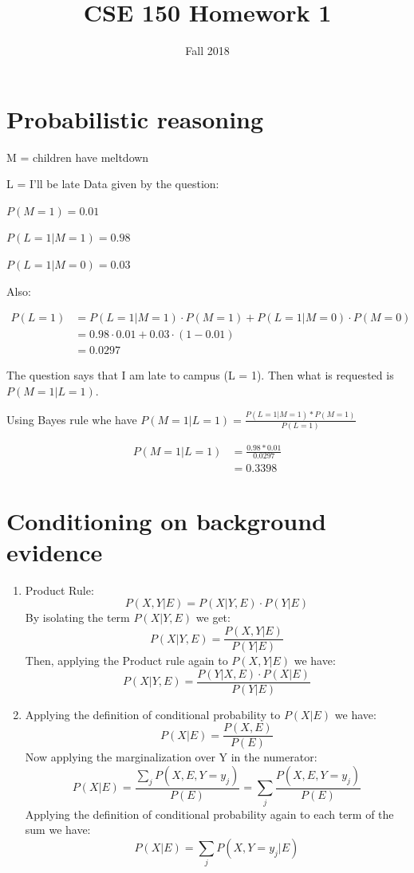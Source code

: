 \documentclass{article}
\title{CSE 150 Homework 1}
\date{Fall 2018}
\begin{document}
\maketitle
\section{Probabilistic reasoning}

\flushleft M = children have meltdown

L = I'll be late
\bigbreak
Data given by the question:

$P(M=1) = 0.01$

$P(L=1|M=1) = 0.98$

$P(L=1|M=0) = 0.03$
\bigbreak

Also:

\begin{align*}
P(L=1) &=P(L=1|M=1) \cdot P(M=1)+P(L=1|M=0) \cdot P(M=0)\\
&=0.98 \cdot 0.01 + 0.03 \cdot (1-0.01)\\
&=0.0297
\end{align*}
\bigbreak

The question says that I am late to campus (L = 1). Then what is requested is $P(M=1|L=1)$.

Using Bayes rule whe have $P(M=1|L=1)=\frac{P(L=1|M=1)*P(M=1)}{P(L=1)}$

\begin{align*}
P(M=1|L=1) & = \frac{0.98*0.01}{0.0297}\\
& = 0.3398
\end{align*}

\section{Conditioning on background evidence}

\begin{enumerate}[label=(\alph*)]
\item 
Product Rule: $$P(X, Y|E)=P(X|Y,E) \cdot P(Y|E)$$
By isolating the term $P(X|Y,E)$ we get:
$$P(X|Y,E)=\frac{P(X, Y|E)}{P(Y|E)}$$
Then, applying the Product rule again to $P(X, Y|E)$ we have:
$$P(X|Y,E)=\frac{P(Y|X,E) \cdot P(X|E)}{P(Y|E)}$$

\item
Applying the definition of conditional probability to $P(X|E)$ we have:
$$P(X|E)=\frac{P(X,E)}{P(E)}$$
Now applying the marginalization over Y in the numerator:
$$P(X|E)=\frac{\sum_{j} P(X,E, Y=y_j)}{P(E)}=\sum_{j}\frac{P(X,E, Y=y_j)}{P(E)}$$
Applying the definition of conditional probability again to each term of the sum we have:
$$P(X|E)=\sum_{j}P(X, Y=y_j|E)$$
\end{enumerate}
\end{document}
